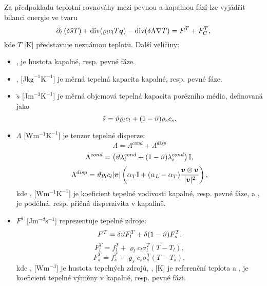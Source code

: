 
Za předpokladu teplotní rovnováhy mezi pevnou a kapalnou fází lze vyjádřit bilanci energie ve tvaru
\[
    \partial_t\left(\delta \tilde s T \right) + \div(\varrho_l c_l T \vc q) - \div(\delta\Lambda\nabla T) = F^T + F^T_C,
\]
kde $T$ [K] představuje neznámou teplotu.
Další veličiny:
\begin{itemize}
\item {},   je hustota kapalné, resp. pevné fáze.
\item {},  [J$\mathrm{kg}^{-1}\mathrm{K}^{-1}$] je měrná tepelná kapacita kapalné, resp. pevné fáze.
\item $\tilde s$ [J$\mathrm{m}^{-3}\mathrm{K}^{-1}$] je měrná objemová tepelná kapacita porézního média, definovaná jako
\[ \tilde s = \hyperA{HeatTransfer-DG-Data::porosity}{\th}\varrho_l c_l + (1-\th)\varrho_s c_s. \]
\item $\Lambda$ [W$\mathrm{m}^{-1}\mathrm{K}^{-1}$] je tenzor tepelné disperze:
\[ \Lambda = \Lambda^{cond} + \Lambda^{disp} \]
\[ \Lambda^{cond} = \left(\th \lambda_l^{cond} + (1-\th)\lambda_s^{cond}\right)\tn I, \]
\[ \Lambda^{disp} = \th \varrho_l c_l|\vc v|\left(\alpha_T\tn I + (\alpha_L-\alpha_T)\frac{\vc v\otimes\vc v}{|\vc v|^2}\right), \]
kde ,  [W$\mathrm{m}^{-1}\mathrm{K}^{-1}$] je koeficient tepelné vodivosti kapalné, resp. pevné fáze, a ,   je podélná, resp. příčná disperzivita v kapalině.

\item $F^T$ [J$\mathrm{m}^{-d}\mathrm{s}^{-1}$] reprezentuje tepelné zdroje:
\[ F^T = \delta \th F^T_l + \delta (1-\th) F^T_s, \]
\[ F^T_l = f_l^T + \varrho_l c_l \sigma^T_l(T-T_l), \]
\[ F^T_s = f_s^T + \varrho_s c_s \sigma^T_s(T-T_s), \]
kde ,  [W$\mathrm{m}^{-3}$] je hustota tepelných zdrojů, ,  [K] je referenční teplota a ,   je koeficient tepelné výměny v kapalné, resp. pevné fázi.
\end{itemize}



